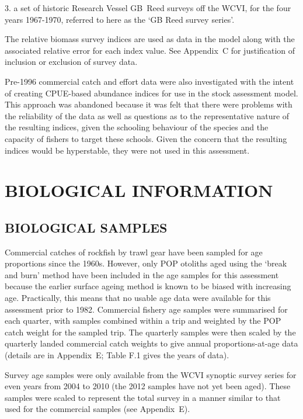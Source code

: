 3. a set of historic Research Vessel GB~Reed surveys off the WCVI, for the four years 1967-1970, referred to here as the `GB Reed survey series'.

The relative biomass survey indices are used as data in the model along with the associated relative error for each index value. See Appendix~C for justification of inclusion or exclusion of survey data.

Pre-1996 commercial catch and effort data were also investigated with the intent of creating CPUE-based abundance indices for use in the stock assessment model.  This approach was abandoned because it was felt that there were problems with the reliability of the data as well as questions as to the representative nature of the resulting indices, given the schooling behaviour of the species and the capacity of fishers to target these schools. Given the concern that the resulting indices would be hyperstable, they were not used in this assessment.


\section{BIOLOGICAL INFORMATION}

\subsection{BIOLOGICAL SAMPLES}

Commercial catches of rockfish by trawl gear have been sampled for age proportions since the 1960s. However, only POP otoliths aged using the `break and burn' method have been included in the age samples for this assessment because the earlier surface ageing method is known to be biased  with increasing age. Practically, this means that no usable age data were available for this assessment prior to 1982. Commercial fishery age samples were summarised for each quarter, with samples combined within a trip and weighted by the POP catch weight for the sampled trip. The quarterly samples were then scaled by the quarterly landed commercial catch weights to give annual proportions-at-age data (details are in Appendix~E; Table F.1 gives the years of data).

Survey age samples were only available from the WCVI synoptic survey series for even years from 2004 to 2010 (the 2012 samples have not yet been aged). These samples were scaled to represent the total survey in a manner similar to that used for the commercial samples (see Appendix~E).


